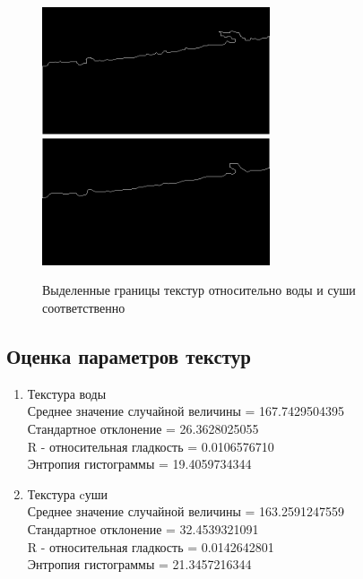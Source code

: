 \begin{figure}[hbt!]
    \centering
    \includegraphics[width=0.6\textwidth]{../outputs/image_countours_segmentation.png}
    \includegraphics[width=0.6\textwidth]{../outputs/image_countours2_segmentation.png}
    \caption{Выделенные границы текстур относительно воды и суши соответственно}
    \label{fig:stich_images}
\end{figure}

\pagebreak

\subsection{Оценка параметров текстур}

\begin{enumerate}
\item Текстура воды \\
Среднее значение случайной величины = 167.7429504395 \\
Стандартное отклонение = 26.3628025055\\
R - относительная гладкость = 0.0106576710\\
Энтропия гистограммы = 19.4059734344\\

\item Текстура cуши \\
Среднее значение случайной величины = 163.2591247559 \\
Стандартное отклонение = 32.4539321091\\
R - относительная гладкость = 0.0142642801\\
Энтропия гистограммы = 21.3457216344\\
\end{enumerate}


